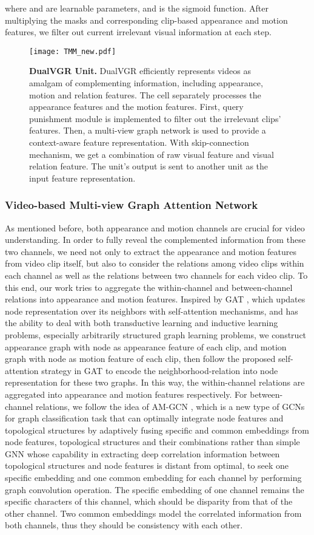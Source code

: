 \documentclass[journal]{IEEEtran}
\begin{document}
where  and  are learnable parameters, and  is the sigmoid function. After multiplying the masks and corresponding clip-based appearance and motion features, we filter out current irrelevant visual information at each step. 
\begin{figure}[t]
    \centering
    \texttt{[image: TMM\_new.pdf]}
    \caption{\textbf{DualVGR Unit.} DualVGR efficiently represents videos as amalgam of complementing information, including appearance, motion and relation features. The cell separately processes the appearance features and the motion features. First, query punishment module is implemented to filter out the irrelevant clips' features. Then, a multi-view graph network is used to provide a context-aware feature representation. With skip-connection mechanism, we get a combination of raw visual feature and visual relation feature. The unit's output is sent to another unit as the input feature representation.}
    \label{fig:DualVGR}
\end{figure}
\subsubsection{Video-based Multi-view Graph Attention Network}
As mentioned before, both appearance and motion channels are crucial for video understanding. In order to fully reveal the complemented information from these two channels, we need not only to extract the appearance and motion features from video clip itself, but also to consider the relations among video clips within each channel as well as the relations between two channels for each video clip. To this end, our work tries to aggregate the within-channel and between-channel relations into appearance and motion features. Inspired by GAT \cite{velivckovic2017graph}, which updates node representation over its neighbors with self-attention mechanisms, and has the ability to deal with both transductive learning and inductive learning problems, especially arbitrarily structured graph learning problems, we construct appearance graph with node as appearance feature of each clip, and motion graph with node as motion feature of each clip, then follow the proposed self-attention strategy in GAT to encode the neighborhood-relation into node representation for these two graphs. In this way, the within-channel relations are aggregated into appearance and motion features respectively. For between-channel relations, we follow the idea of AM-GCN \cite{wang2020gcn}, which is a new type of GCNs for graph classification task that can optimally integrate node features and topological structures by adaptively fusing specific and common embeddings from node features, topological structures and their combinations rather than simple GNN whose capability in extracting deep correlation information between topological structures and node features is distant from optimal, to seek one specific embedding and one common embedding for each channel by performing graph convolution operation. The specific embedding of one channel remains the specific characters of this channel, which should be disparity from that of the other channel. Two common embeddings model the correlated information from both channels, thus they should be consistency with each other.
\end{document}
